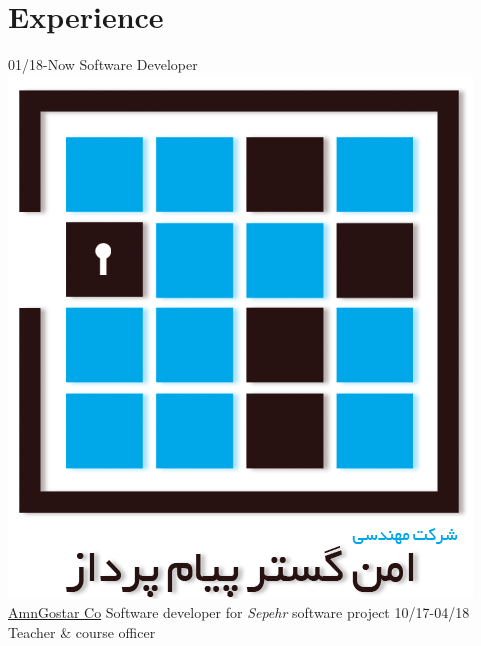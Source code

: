 \documentclass[a4paper]{friggeri-cv}
\begin{document}
\section{Experience}
\begin{entrylist}
  \entry
    {01/18-Now}
    {    Software Developer}
    {\href{http://www.amngostar-co.com}{\includegraphics[scale=0.04]{img/AmnGostar_logo.png} AmnGostar Co}}
    {Software developer for \emph{Sepehr} software project}
  \entry
    {10/17-04/18}
    {    Teacher \& course officer}

\end{entrylist}
\end{document}

